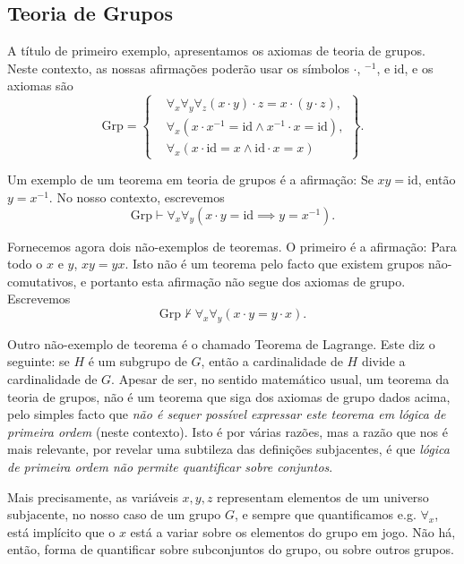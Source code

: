 \subsection*{Teoria de Grupos}

A título de primeiro exemplo, apresentamos os axiomas de teoria de grupos. Neste contexto, as nossas afirmações poderão usar os símbolos $\cdot$, ${}^{-1}$, e $\mathrm{id}$, e os axiomas são
\begin{equation}
\mathrm{Grp} = \left\{
\begin{aligned}
&\forall_x \forall_y \forall_z (x \cdot y) \cdot z = x \cdot (y \cdot z),\\
&\forall_x (x \cdot x^{-1} = \mathrm{id} \land x^{-1} \cdot x = \mathrm{id}),\\
&\forall_x (x \cdot \mathrm{id} = x \land \mathrm{id} \cdot x = x)
\end{aligned}
\right\}.
\end{equation}

Um exemplo de um teorema em teoria de grupos é a afirmação: Se $xy = \mathrm{id}$, então $y = x^{-1}$. No nosso contexto, escrevemos
\begin{equation}
\mathrm{Grp} \vdash \forall_x \forall_y (x \cdot y = \mathrm{id} \implies y = x^{-1}).
\end{equation}

Fornecemos agora dois não-exemplos de teoremas. O primeiro é a afirmação: Para todo o $x$ e $y$, $xy = yx$. Isto não é um teorema pelo facto que existem grupos não-comutativos, e portanto esta afirmação não segue dos axiomas de grupo. Escrevemos
\begin{equation}
\mathrm{Grp} \nvdash \forall_x \forall_y (x\cdot y = y\cdot x).
\end{equation}

Outro não-exemplo de teorema é o chamado Teorema de Lagrange. Este diz o seguinte: se $H$ é um subgrupo de $G$, então a cardinalidade de $H$ divide a cardinalidade de $G$. Apesar de ser, no sentido matemático usual, um teorema da teoria de grupos, não é um teorema que siga dos axiomas de grupo dados acima, pelo simples facto que \emph{não é sequer possível expressar este teorema em lógica de primeira ordem} (neste contexto). Isto é por várias razões, mas a razão que nos é mais relevante, por revelar uma subtileza das definições subjacentes, é que \emph{lógica de primeira ordem não permite quantificar sobre conjuntos}.

Mais precisamente, as variáveis $x, y, z$ representam elementos de um universo subjacente, no nosso caso de um grupo $G$, e sempre que quantificamos e.g. $\forall_x$, está implícito que o $x$ está a variar sobre os elementos do grupo em jogo. Não há, então, forma de quantificar sobre subconjuntos do grupo, ou sobre outros grupos.

